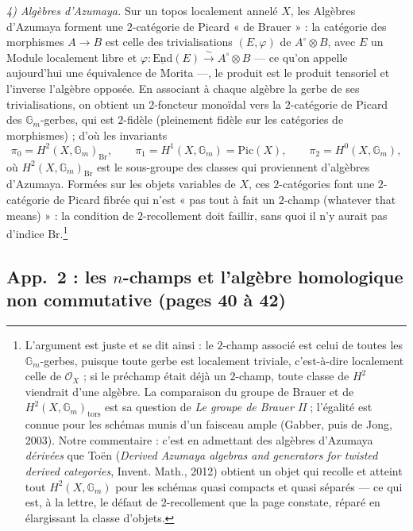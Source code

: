 \documentclass[11pt,a4paper]{article}
\begin{document}
\emph{4) Algèbres d'Azumaya.} Sur un topos localement annelé $X$, les
Algèbres d'Azumaya forment une $2$-catégorie de Picard « de Brauer » : la
catégorie des morphismes $A \to B$ est celle des trivialisations
$(E,\varphi)$ de $A^{\circ}\otimes B$, avec $E$ un Module localement libre
et $\varphi : \underline{\mathrm{End}}(E) \xrightarrow{\sim} A^{\circ}\otimes
B$ --- ce qu'on appelle aujourd'hui une équivalence de Morita ---, le
produit est le produit tensoriel et l'inverse l'algèbre opposée. En
associant à chaque algèbre la gerbe de ses trivialisations, on obtient un
$2$-foncteur monoïdal vers la $2$-catégorie de Picard des $\mathbb{G}_m$-gerbes, qui
est $2$-fidèle (pleinement fidèle sur les catégories de morphismes) ; d'où
les invariants
\[
\pi_0 = H^2(X,\mathbb{G}_m)_{\mathrm{Br}}, \qquad \pi_1 = H^1(X,\mathbb{G}_m) = \mathrm{Pic}(X), \qquad \pi_2 = H^0(X,\mathbb{G}_m),
\]
où $H^2(X,\mathbb{G}_m)_{\mathrm{Br}}$ est le sous-groupe des classes qui
proviennent d'algèbres d'Azumaya. Formées sur les objets variables de $X$,
ces $2$-catégories font une $2$-catégorie de Picard fibrée qui n'est « pas
tout à fait un $2$-champ (whatever that means) » : la condition de
$2$-recollement doit faillir, sans quoi il n'y aurait pas d'indice
$\mathrm{Br}$.\footnote{L'argument est juste et se dit ainsi : le
$2$-champ associé est celui de toutes les $\mathbb{G}_m$-gerbes, puisque
toute gerbe est localement triviale, c'est-à-dire localement celle de
$\mathcal{O}_X$ ; si le préchamp était déjà un $2$-champ, toute classe de
$H^2$ viendrait d'une algèbre. La comparaison du groupe de Brauer et de
$H^2(X,\mathbb{G}_m)_{\mathrm{tors}}$ est sa question de \emph{Le groupe de
Brauer II} ; l'égalité est connue pour les schémas munis d'un faisceau
ample (Gabber, puis de Jong, 2003). Notre commentaire : c'est en admettant
des algèbres d'Azumaya \emph{dérivées} que Toën (\emph{Derived Azumaya
algebras and generators for twisted derived categories}, Invent. Math.,
2012) obtient un objet qui recolle et atteint tout $H^2(X,\mathbb{G}_m)$
pour les schémas quasi compacts et quasi séparés --- ce qui est, à la
lettre, le défaut de $2$-recollement que la page constate, réparé en
élargissant la classe d'objets.}

\subsection*{App.~2 : les $n$-champs et l'algèbre homologique non commutative (pages 40 à 42)}
\end{document}
